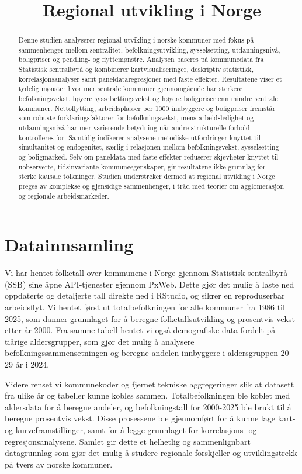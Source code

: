 \documentclass[
  norsk,
  letterpaper,
  DIV=11,
  numbers=noendperiod]{scrartcl}
\title{Regional utvikling i Norge}
\author{}
\date{}
\begin{document}
\maketitle
\begin{abstract}
Denne studien analyserer regional utvikling i norske kommuner med fokus
på sammenhenger mellom sentralitet, befolkningsutvikling, sysselsetting,
utdanningsnivå, boligpriser og pendling- og flyttemønstre. Analysen
baseres på kommunedata fra Statistisk sentralbyrå og kombinerer
kartvisualiseringer, deskriptiv statistikk, korrelasjonsanalyser samt
paneldataregresjoner med faste effekter. Resultatene viser et tydelig
mønster hvor mer sentrale kommuner gjennomgående har sterkere
befolkningsvekst, høyere sysselsettingsvekst og høyere boligpriser enn
mindre sentrale kommuner. Nettoflytting, arbeidsplasser per 1000
innbyggere og boligpriser fremstår som robuste forklaringsfaktorer for
befolkningsvekst, mens arbeidsledighet og utdanningsnivå har mer
varierende betydning når andre strukturelle forhold kontrolleres for.
Samtidig indikerer analysene metodiske utfordringer knyttet til
simultanitet og endogenitet, særlig i relasjonen mellom
befolkningsvekst, sysselsetting og boligmarked. Selv om paneldata med
faste effekter reduserer skjevheter knyttet til uobserverte,
tidsinvariante kommuneegenskaper, gir resultatene ikke grunnlag for
sterke kausale tolkninger. Studien understreker dermed at regional
utvikling i Norge preges av komplekse og gjensidige sammenhenger, i tråd
med teorier om agglomerasjon og regionale arbeidsmarkeder.
\end{abstract}


\section{Datainnsamling}\label{datainnsamling}

Vi har hentet folketall over kommunene i Norge gjennom Statistisk
sentralbyrå (SSB) sine åpne API-tjenester gjennom PxWeb. Dette gjør det
mulig å laste ned oppdaterte og detaljerte tall direkte ned i RStudio,
og sikrer en reproduserbar arbeidsflyt. Vi hentet først ut
totalbefolkningen for alle kommuner fra 1986 til 2025, som danner
grunnlaget for å beregne folketallsutvikling og prosentvis vekst etter
år 2000. Fra samme tabell hentet vi også demografiske data fordelt på
tiårige aldersgrupper, som gjør det mulig å analysere
befolkningssammensetningen og beregne andelen innbyggere i aldersgruppen
20-29 år i 2024.

Videre renset vi kommunekoder og fjernet tekniske aggregeringer slik at
datasett fra ulike år og tabeller kunne kobles sammen. Totalbefolkningen
ble koblet med aldersdata for å beregne andeler, og befolkningstall for
2000-2025 ble brukt til å beregne prosentvis vekst. Disse prosessene ble
gjennomført for å kunne lage kart- og kurveframstillinger, samt for å
legge grunnlaget for korrelasjons- og regresjonsanalysene. Samlet gir
dette et helhetlig og sammenlignbart datagrunnlag som gjør det mulig å
studere regionale forskjeller og utviklingstrekk på tvers av norske
kommuner.
\end{document}
